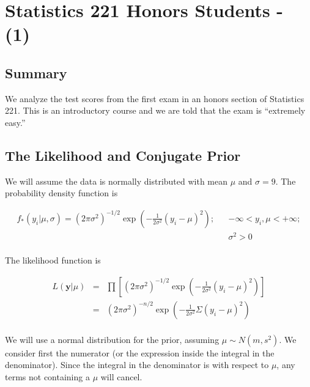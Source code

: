 \documentclass[12pt]{article}
\begin{document}
\newpage

\section{Statistics 221 Honors Students - (1)}

\subsection{Summary}

\noindent We analyze the test scores from the first exam in an honors section of Statistics 221.  This is an introductory course and we are told that the exam is ``extremely easy.''

\subsection{The Likelihood and Conjugate Prior}

\noindent We will assume the data is normally distributed with mean $\mu$ and $\sigma=9$.  The probability density function is

\begin{eqnarray*}
f_*(y_i|\mu,\sigma)=(2\pi\sigma^2)^{-1/2}\exp\left(-\frac{1}{2\sigma^2}(y_i-\mu)^2\right); && -\infty<y_i,\mu<+\infty; \\
&& \sigma^2>0 \\
\end{eqnarray*}

\noindent The likelihood function is

\begin{eqnarray*}
L(\mathbf{y}|\mu) &=& \prod\left[(2\pi\sigma^2)^{-1/2}\exp\left(-\frac{1}{2\sigma^2}(y_i-\mu)^2\right)\right] \\
&=& (2\pi\sigma^2)^{-n/2}\exp\left(-\frac{1}{2\sigma^2}\Sigma(y_i-\mu)^2\right) \\
\end{eqnarray*}

\noindent We will use a normal distribution for the prior, assuming $\mu\sim N(m,s^2)$. We consider first the numerator (or the expression inside the integral in the denominator). Since the integral in the denominator is with respect to $\mu$, any terms not containing a $\mu$ will cancel.
\end{document}
